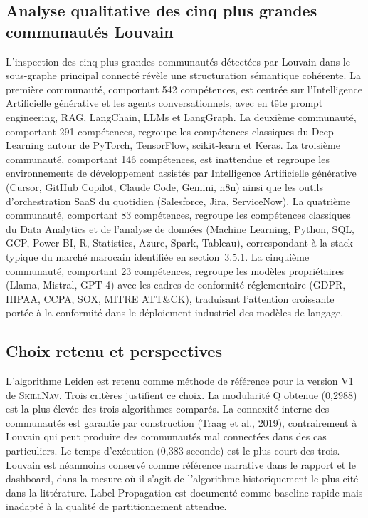 \documentclass[11pt,a4paper,openany]{report}
\newcommand{\skillnav}{\textsc{SkillNav}\xspace}
\begin{document}
\subsection{Analyse qualitative des cinq plus grandes communaut\'es Louvain}

L'inspection des cinq plus grandes communaut\'es d\'etect\'ees par Louvain dans le sous-graphe principal connect\'e r\'ev\`ele une structuration s\'emantique coh\'erente. La premi\`ere communaut\'e, comportant 542 comp\'etences, est centr\'ee sur l'Intelligence Artificielle g\'en\'erative et les agents conversationnels, avec en t\^ete prompt engineering, RAG, LangChain, LLMs et LangGraph. La deuxi\`eme communaut\'e, comportant 291 comp\'etences, regroupe les comp\'etences classiques du Deep Learning autour de PyTorch, TensorFlow, scikit-learn et Keras. La troisi\`eme communaut\'e, comportant 146 comp\'etences, est inattendue et regroupe les environnements de d\'eveloppement assist\'es par Intelligence Artificielle g\'en\'erative (Cursor, GitHub Copilot, Claude Code, Gemini, n8n) ainsi que les outils d'orchestration SaaS du quotidien (Salesforce, Jira, ServiceNow). La quatri\`eme communaut\'e, comportant 83 comp\'etences, regroupe les comp\'etences classiques du Data Analytics et de l'analyse de donn\'ees (Machine Learning, Python, SQL, GCP, Power BI, R, Statistics, Azure, Spark, Tableau), correspondant \`a la stack typique du march\'e marocain identifi\'ee en section~3.5.1. La cinqui\`eme communaut\'e, comportant 23 comp\'etences, regroupe les mod\`eles propri\'etaires (Llama, Mistral, GPT-4) avec les cadres de conformit\'e r\'eglementaire (GDPR, HIPAA, CCPA, SOX, MITRE ATT\&CK), traduisant l'attention croissante port\'ee \`a la conformit\'e dans le d\'eploiement industriel des mod\`eles de langage.

\subsection{Choix retenu et perspectives}

L'algorithme Leiden est retenu comme m\'ethode de r\'ef\'erence pour la version V1 de \skillnav. Trois crit\`eres justifient ce choix. La modularit\'e Q obtenue (0,2988) est la plus \'elev\'ee des trois algorithmes compar\'es. La connexit\'e interne des communaut\'es est garantie par construction (Traag et al., 2019), contrairement \`a Louvain qui peut produire des communaut\'es mal connect\'ees dans des cas particuliers. Le temps d'ex\'ecution (0,383 seconde) est le plus court des trois. Louvain est n\'eanmoins conserv\'e comme r\'ef\'erence narrative dans le rapport et le dashboard, dans la mesure o\`u il s'agit de l'algorithme historiquement le plus cit\'e dans la litt\'erature. Label Propagation est document\'e comme baseline rapide mais inadapt\'e \`a la qualit\'e de partitionnement attendue.
\end{document}
